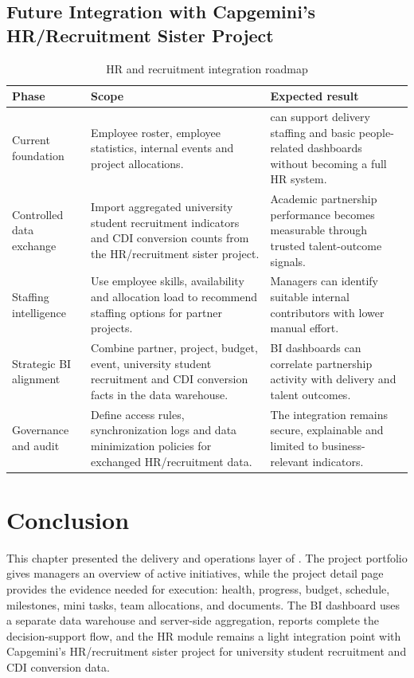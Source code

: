 \subsection{Future Integration with Capgemini's HR/Recruitment Sister Project}
\begin{table}[H]
  \centering
  \caption{HR and recruitment integration roadmap}\label{tab:hr-roadmap}
  \begin{tabularx}{\textwidth}{>{\raggedright\arraybackslash}p{3.2cm}>{\raggedright\arraybackslash}p{4.4cm}X}
    \toprule
    Phase & Scope & Expected result \\
    \midrule
    Current foundation & Employee roster, employee statistics, internal events and project allocations. & \projectname{} can support delivery staffing and basic people-related dashboards without becoming a full HR system. \\
    Controlled data exchange & Import aggregated university student recruitment indicators and CDI conversion counts from the HR/recruitment sister project. & Academic partnership performance becomes measurable through trusted talent-outcome signals. \\
    Staffing intelligence & Use employee skills, availability and allocation load to recommend staffing options for partner projects. & Managers can identify suitable internal contributors with lower manual effort. \\
    Strategic BI alignment & Combine partner, project, budget, event, university student recruitment and CDI conversion facts in the data warehouse. & BI dashboards can correlate partnership activity with delivery and talent outcomes. \\
    Governance and audit & Define access rules, synchronization logs and data minimization policies for exchanged HR/recruitment data. & The integration remains secure, explainable and limited to business-relevant indicators. \\
    \bottomrule
  \end{tabularx}
\end{table}
\section{Conclusion}
This chapter presented the delivery and operations layer of \projectname{}. The project portfolio gives managers an overview of active initiatives, while the project detail page provides the evidence needed for execution: health, progress, budget, schedule, milestones, mini tasks, team allocations, and documents. The BI dashboard uses a separate data warehouse and server-side aggregation, reports complete the decision-support flow, and the HR module remains a light integration point with Capgemini's HR/recruitment sister project for university student recruitment and CDI conversion data.
